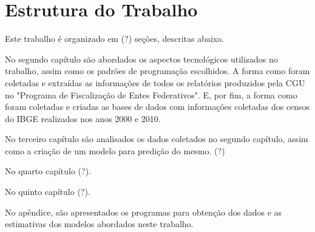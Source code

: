 \section{Estrutura do Trabalho}
\label{sec:estrutura_do_trabalho}

Este trabalho é organizado em (?) seções, descritas abaixo.

No segundo capítulo são abordados os aspectos tecnológicos utilizados no trabalho, assim como os padrões de programação escolhidos. A forma como foram coletadas e extraídas as informações de todos os relatórios produzidos pela CGU no "Programa de Fiscalização de Entes Federativos". E, por fim, a forma como foram coletadas e criadas as bases de dados com informações coletadas dos censos do IBGE realizados nos anos 2000 e 2010.

No terceiro capítulo são analisados os dados coletados no segundo capítulo, assim como a criação de um modelo para predição do mesmo. (?)

No quarto capítulo (?).

No quinto capítulo (?). %

No apêndice, são apresentados os programas para obtenção dos dados e as estimativas dos modelos abordados neste trabalho.

